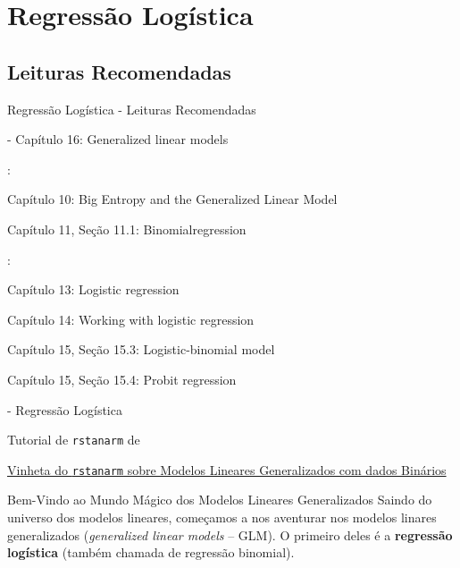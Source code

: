 \section{Regressão Logística}

\subsection{Leituras Recomendadas}
\begin{frame}{Regressão Logística - Leituras Recomendadas}
    \begin{vfilleditems}
        \item \textcite{gelman2013bayesian} - Capítulo 16: Generalized linear models
        \item \textcite{mcelreath2020statistical}:
        \begin{vfilleditems}
            \item Capítulo 10: Big Entropy and the Generalized Linear Model
            \item Capítulo 11, Seção 11.1: Binomialregression
        \end{vfilleditems}
        \item \textcite{gelman2020regression}:
        \begin{vfilleditems}
            \item Capítulo 13: Logistic regression
            \item Capítulo 14: Working with logistic regression
            \item Capítulo 15, Seção 15.3: Logistic-binomial model
            \item Capítulo 15, Seção 15.4: Probit regression
        \end{vfilleditems}
        \item \textcite{storopoli2021estatisticabayesianaR} - Regressão Logística
        \item Tutorial de \texttt{rstanarm} de \textcite{muth2018user}
        \item \href{http://mc-stan.org/rstanarm/articles/binomial.html}{Vinheta do \texttt{rstanarm} sobre Modelos Lineares Generalizados com dados Binários}
    \end{vfilleditems}
\end{frame}

\begin{frame}{Bem-Vindo ao Mundo Mágico dos Modelos Lineares Generalizados}
    Saindo do universo dos modelos lineares, começamos a nos aventurar nos modelos
    linares generalizados (\textit{generalized linear models} -- GLM).
    \vfill
    O primeiro deles é a \textbf{regressão logística}
    (também chamada de regressão binomial).
\end{frame}

